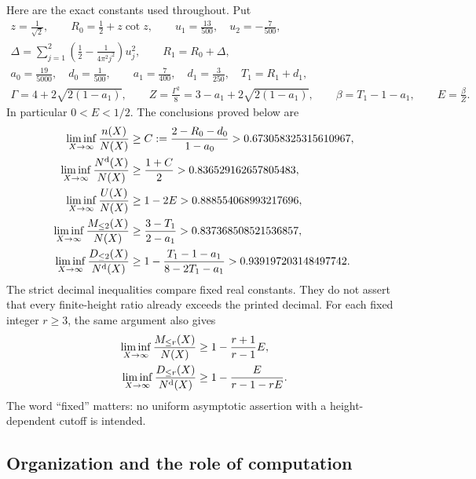 \documentclass[11pt]{amsart}
\numberwithin{equation}{section}
\newcommand{\Nd}{N^{\rm d}}
\begin{document}
Here are the exact constants used throughout. Put
\begin{gather}
 z=\frac1{\sqrt2},\qquad R_0=\frac12+z\cot z,
 \qquad u_1=\frac{13}{500},\quad u_2=-\frac7{500},\label{eq:R0}\\
 \Delta=\sum_{j=1}^2\left(\frac12-\frac1{4\pi^2j^2}\right)u_j^2,
 \qquad R_1=R_0+\Delta,\label{eq:Delta}\\
 a_0=\frac{19}{5000},\quad d_0=\frac1{500},\qquad
 a_1=\frac7{400},\quad d_1=\frac3{250},\quad T_1=R_1+d_1,\label{eq:rowconstants}\\
 \Gamma=4+2\sqrt{2(1-a_1)},\qquad
 Z=\frac{\Gamma^2}{8}=3-a_1+2\sqrt{2(1-a_1)},\qquad
 \beta=T_1-1-a_1,\qquad E=\frac{\beta}{Z}.\label{eq:E}
\end{gather}
In particular $0<E<1/2$. The conclusions proved below are
\begin{align}
 \liminf_{X\to\infty}\frac{n(X)}{N(X)}
 &\ge C:=\frac{2-R_0-d_0}{1-a_0}
 >0.673058325315610967,\label{eq:headlineintersection}\\
 \liminf_{X\to\infty}\frac{\Nd(X)}{N(X)}
 &\ge\frac{1+C}{2}>0.836529162657805483,\label{eq:headlinedistinct}\\
 \liminf_{X\to\infty}\frac{U(X)}{N(X)}
 &\ge1-2E>0.888554068993217696,\label{eq:headlineunion}\\
 \liminf_{X\to\infty}\frac{M_{\le2}(X)}{N(X)}
 &\ge\frac{3-T_1}{2-a_1}>0.837368508521536857,\label{eq:headlinemass}\\
 \liminf_{X\to\infty}\frac{D_{\le2}(X)}{\Nd(X)}
 &\ge1-\frac{T_1-1-a_1}{8-2T_1-a_1}
 >0.939197203148497742.\label{eq:headlinelocations}
\end{align}
The strict decimal inequalities compare fixed real constants. They do not
assert that every finite-height ratio already exceeds the printed decimal.
For each fixed integer $r\ge3$, the same argument also gives
\begin{align}
 \liminf_{X\to\infty}\frac{M_{\le r}(X)}{N(X)}
 &\ge1-\frac{r+1}{r-1}E,\label{eq:highermass}\\
 \liminf_{X\to\infty}\frac{D_{\le r}(X)}{\Nd(X)}
 &\ge1-\frac{E}{r-1-rE}.\label{eq:higherlocations}
\end{align}
The word ``fixed'' matters: no uniform asymptotic assertion with a
height-dependent cutoff is intended.



\subsection{Organization and the role of computation}
\end{document}

